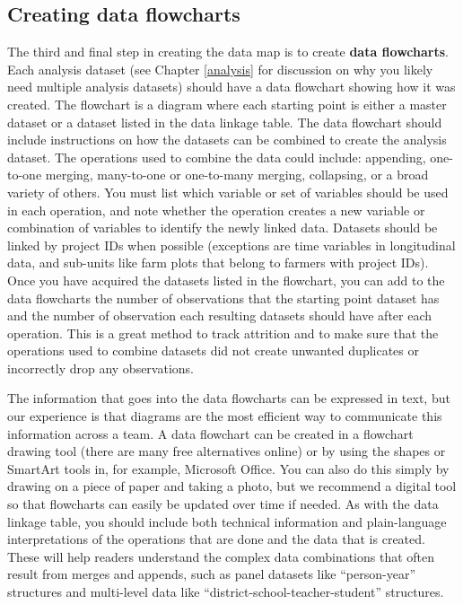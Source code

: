 \documentclass[
]{book}
\begin{document}
\hypertarget{creating-data-flowcharts}{%
\subsection*{Creating data flowcharts}\label{creating-data-flowcharts}}

The third and final step in creating the data map is
to create \textbf{data flowcharts}.
Each analysis dataset
(see Chapter \ref{analysis} for discussion on why you likely need multiple analysis datasets)
should have a data flowchart showing how it was created.
The flowchart is a diagram
where each starting point is either a master dataset
or a dataset listed in the data linkage table.
The data flowchart should include instructions on how
the datasets can be combined to create the analysis dataset.
The operations used to combine the data could include:
appending, one-to-one merging,
many-to-one or one-to-many merging, collapsing, or a broad variety of others.
You must list which variable or set of variables
should be used in each operation,
and note whether the operation creates a new variable or combination of variables
to identify the newly linked data.
Datasets should be linked by project IDs when possible
(exceptions are time variables in longitudinal data,
and sub-units like farm plots that belong to farmers with project IDs).
Once you have acquired the datasets listed in the flowchart,
you can add to the data flowcharts the number of observations that
the starting point dataset has
and the number of observation each resulting datasets
should have after each operation.
This is a great method to track attrition and to make sure that
the operations used to combine datasets did not create unwanted duplicates
or incorrectly drop any observations.

The information that goes into the data flowcharts can be expressed in text,
but our experience is that diagrams are the most efficient way to communicate this information across a team.
A data flowchart can be created in a flowchart drawing tool
(there are many free alternatives online) or
by using the shapes or SmartArt tools in, for example, Microsoft Office.
You can also do this simply by drawing on a piece of paper and taking a photo,
but we recommend a digital tool
so that flowcharts can easily be updated over time if needed.
As with the data linkage table,
you should include both technical information
and plain-language interpretations
of the operations that are done and the data that is created.
These will help readers understand the complex data combinations
that often result from merges and appends,
such as panel datasets like ``person-year'' structures
and multi-level data like ``district-school-teacher-student'' structures.
\end{document}
